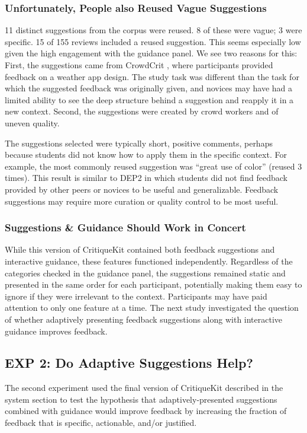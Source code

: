 \subsubsection{Unfortunately, People also Reused Vague Suggestions}
11 distinct suggestions from the corpus were reused. 8 of these were vague; 3 were specific. 15 of 155 reviews included a reused suggestion. This seems especially low given the high engagement with the guidance panel. We see two reasons for this: First, the suggestions came from CrowdCrit \cite{Luther2015}, where participants provided feedback on a weather app design. The study task was different than the task for which the suggested feedback was originally given, and novices may have had a limited ability to see the deep structure behind a suggestion and reapply it in a new context. Second, the suggestions were created by crowd workers and of uneven quality. 

The suggestions selected were typically short, positive comments, perhaps because students did not know how to apply them in the specific context. For example, the most commonly reused suggestion was ``great use of color'' (reused 3 times). This result is similar to DEP2 in which students did not find feedback provided by other peers or novices to be useful and generalizable. Feedback suggestions may require more curation or quality control to be most useful. 

\subsubsection{Suggestions \& Guidance Should Work in Concert}
While this version of CritiqueKit contained both feedback suggestions and interactive guidance, these features functioned independently. Regardless of the categories checked in the guidance panel, the suggestions remained static and presented in the same order for each participant, potentially making them easy to ignore if they were irrelevant to the context. Participants may have paid attention to only one feature at a time. The next study investigated the question of whether adaptively presenting feedback suggestions along with interactive guidance improves feedback. 

\subsection{EXP 2: Do Adaptive Suggestions Help?}
The second experiment used the final version of CritiqueKit described in the system section to test the hypothesis that adaptively-presented suggestions combined with guidance would improve feedback by increasing the fraction of feedback that is specific, actionable, and/or justified.

